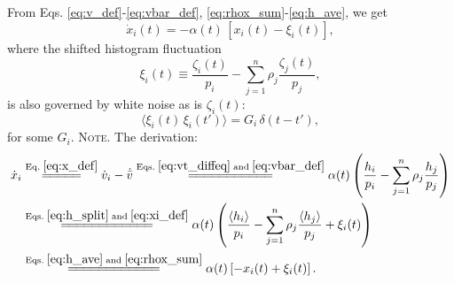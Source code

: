 \documentclass[reprint, superscriptaddress, floatfix]{revtex4-1}
\newcommand{\note}[1]{{\color{DarkGreen}\footnotesize \textsc{Note.} #1}}
\begin{document}
%


From Eqs.
\eqref{eq:v_def}-\eqref{eq:vbar_def},
\eqref{eq:rhox_sum}-\eqref{eq:h_ave},
we get %
%
\begin{equation}
  \dot x_i(t)
  =
  -\alpha(t) \, \left[ x_i(t) - \xi_i(t) \right]
  ,
\label{eq:dxdt_singlebin}
\end{equation}
%
where the shifted histogram fluctuation
%
\begin{equation}
  \xi_i(t)
  \equiv
  \frac{ \zeta_i(t) }
       { p_i }
  -
  \sum_{ j = 1 }^n
    \rho_j
    \frac{ \zeta_j(t) }
         {     p_j    }
  ,
\label{eq:xi_def}
\end{equation}
%
is also governed by white noise as is $\zeta_i(t)$:
\begin{equation}
  \langle \xi_i(t) \, \xi_i(t') \rangle
  = G_i \, \delta(t - t')
  ,
  \label{eq:G_def}
\end{equation}
for some $G_i$.
%
\note{The derivation:
$$
\begin{aligned}
  \dot x_i
  &\stackrel{\mathrm{Eq.\; \eqref{eq:x_def}}}
            {=\joinrel=\joinrel=\joinrel=\joinrel=}
  \dot v_i - \dot{ \bar v }
  \stackrel{\mathrm{Eqs.\; \eqref{eq:vt_diffeq}\; and\; \eqref{eq:vbar_def}}}
            {=\joinrel=\joinrel=\joinrel=\joinrel=\joinrel=\joinrel=\joinrel=\joinrel=\joinrel=\joinrel=}
  \alpha(t) \left(
    \frac{ h_i } { p_i }
    -
    \sum_{ j = 1 }^n
      \rho_j \frac{ h_j } { p_j }
  \right)
  \\
  &\stackrel{\mathrm{Eqs.\; \eqref{eq:h_split} \; and \; \eqref{eq:xi_def}}}
            {=\joinrel=\joinrel=\joinrel=\joinrel=\joinrel=\joinrel=\joinrel=\joinrel=\joinrel=\joinrel=\joinrel=}
  \alpha(t) \left(
    \frac{ \langle h_i \rangle } { p_i }
    -
    \sum_{ j = 1 }^n
      \rho_j \frac{ \langle h_j \rangle } { p_j }
    +
    \xi_i(t)
  \right)
  \\
  &\stackrel{\mathrm{Eqs.\; \eqref{eq:h_ave} \;and\; \eqref{eq:rhox_sum}}}
            {=\joinrel=\joinrel=\joinrel=\joinrel=\joinrel=\joinrel=\joinrel=\joinrel=\joinrel=\joinrel=\joinrel=}
  \alpha(t) \left[ -x_i(t) + \xi_i(t) \right].
\end{aligned}
$$
}
\end{document}
